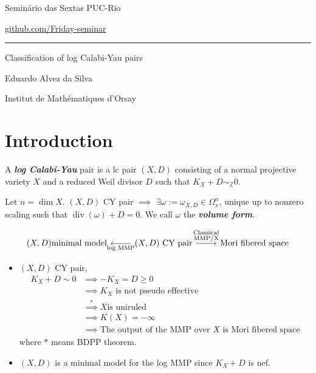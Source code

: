 



\begin{minipage}{\textwidth}
	\begin{minipage}{1\textwidth}
		Semin\'ario das Sextas \hfill PUC-Rio
		
		{\small\hfill\href{https://github.com/Friday-seminar/}{github.com/Friday-seminar}}
	\end{minipage}
\end{minipage}\vspace{.2cm}\hrule

\vspace{10pt}

{\Huge Classification of log Calabi-Yau pairs}

\hfill{\Large Eduardo Alvez da Silva}

\hfill{\large Institut de Mathématiques d'Orsay}

\tableofcontents

\section{Introduction}


\begin{defn}
	A \textit{\textbf{log Calabi-Yau}} pair is a lc pair  $(X,D)$ consisting of a normal projective variety $X$ and a reduced Weil divisor $D$ such that $K_X+D\sim_{\mathbb{Z}}0$.
\end{defn}

\begin{remark}
	Let $n=\dim X$. $(X,D)$ CY pair $\implies $ $\exists \omega:=\omega_{X,D}\in\Omega^n_x$, unique up to nonzero scaling such that $\operatorname{div}(\omega)+D=0$. We call $\omega$ the \textit{\textbf{volume form}}.
\end{remark}

\[\begin{tikzcd}
	(X,D)\text{minimal model}& \arrow[l,"\text{log MMP}" ](X,D)\text{ CY pair} \arrow[r,"\substack{\text{Classical}\\\text{MMP/X}}"  ]&\text{Mori fibered space} 
\end{tikzcd}\]

\begin{itemize}
	\item $(X,D)$ CY pair,
\begin{align*}
	K_{X}+D\sim 0 &\implies -K_X=D\geq 0\\
	&\implies K_X\text{ is not pseudo effective}\\
	&\overset{*}{\implies } X \text{is uniruled}\\
	&\implies K(X)=-\infty\\
	&\implies \text{The output of the  MMP over $X$ is Mori fibered space} 
\end{align*}
where $*$ means BDPP theorem.

	\item $(X,D)$ is a minimal model for the log MMP since $K_X+D$ is nef.
\end{itemize}

